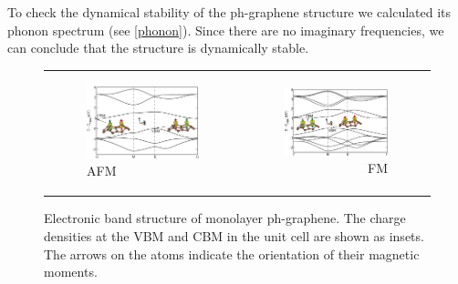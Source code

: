 To check the dynamical stability of the ph-graphene structure we calculated its phonon spectrum (see \autoref{phonon}). Since there are no imaginary frequencies, we can conclude that the structure is dynamically stable.


\begin{figure}[htbp]
  \centering
  \begin{tabular}{lr}
  \begin{subfigure}{0.45\linewidth}
    \includegraphics[scale=0.235]{PG_AFM.eps}%
    \caption{AFM}
  \end{subfigure} &
  \begin{subfigure}{0.45\linewidth}
    \includegraphics[scale=0.235]{PG_FM.eps}%
    \caption{FM}
  \end{subfigure}    
  \end{tabular}
\caption{ Electronic band structure of monolayer ph-graphene. The charge densities at the VBM and CBM in the unit cell are shown as insets. The arrows on the atoms indicate the orientation of their magnetic moments.\label{electronic} }
\end{figure}

